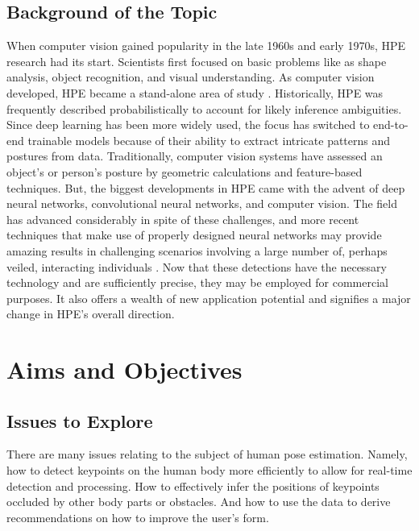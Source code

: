 \documentclass[runningheads]{llncs}
\begin{document}
    \subsection{Background of the Topic}
        When computer vision gained popularity in the late 1960s and early 1970s, HPE research had its start. Scientists first focused on basic problems like as shape analysis, object recognition, and visual understanding. As computer vision developed, HPE became a stand-alone area of study \parencite{Roboflow}. Historically, HPE was frequently described probabilistically to account for likely inference ambiguities. Since deep learning has been more widely used, the focus has switched to end-to-end trainable models because of their ability to extract intricate patterns and postures from data. Traditionally, computer vision systems have assessed an object's or person's posture by geometric calculations and feature-based techniques. But, the biggest developments in HPE came with the advent of deep neural networks, convolutional neural networks, and computer vision. The field has advanced considerably in spite of these challenges, and more recent techniques that make use of properly designed neural networks may provide amazing results in challenging scenarios involving a large number of, perhaps veiled, interacting individuals \parencite{liu2018recognizing}. Now that these detections have the necessary technology and are sufficiently precise, they may be employed for commercial purposes. It also offers a wealth of new application potential and signifies a major change in HPE's overall direction.



\section{Aims and Objectives} %
    \subsection{Issues to Explore}
        There are many issues relating to the subject of human pose estimation. Namely, how to detect keypoints on the human body more efficiently to allow for real-time detection and processing. How to effectively infer the positions of keypoints occluded by other body parts or obstacles. And how to use the data to derive recommendations on how to improve the user's form.
\end{document}
